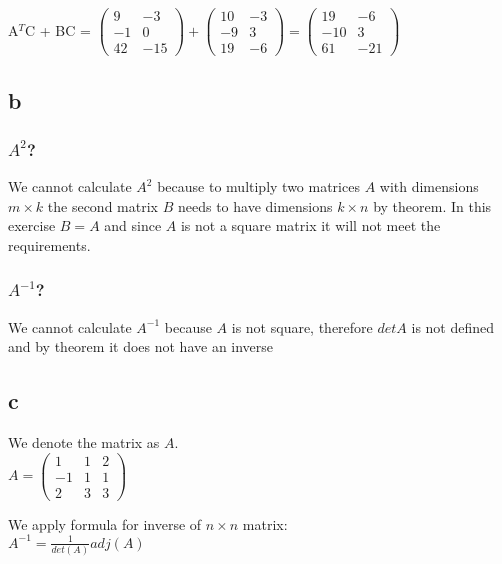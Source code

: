 \documentclass{article}
\begin{document}
A$^{T}$C + BC =
$
\left (
    \begin{matrix}
        9 & -3\\
        -1 & 0\\
        42 & -15
    \end{matrix}
\right )
+
\left (
    \begin{matrix}
        10 & -3\\
        -9 & 3\\
        19 & -6
    \end{matrix}
\right )       
=
\left (
    \begin{matrix}
        19 & -6\\
        -10 & 3\\
        61 & -21
    \end{matrix}
\right )
$

\subsection*{b}

\subsubsection*{$A^{2}$?}
We cannot calculate $A^{2}$ because to multiply two matrices $A$ with dimensions $m \times k$ the second matrix $B$ needs to have dimensions $k \times n$ by theorem. In this exercise $B=A$ and since $A$ is not a square matrix it will not meet the requirements.

\subsubsection*{$A^{-1}$?}
We cannot calculate $A^{-1}$ because $A$ is not square, therefore $detA$ is not defined and by theorem it does not have an inverse

\subsection*{c}
We denote the matrix as $A$.\\
$A=
\left (
    \begin{matrix}
        1 & 1 & 2\\
        -1 & 1 & 1\\
        2 & 3 & 3
    \end{matrix}
\right )
$

We apply formula for inverse of $n \times n$ matrix:\\
$A^{-1} = \frac{1}{det(A)} adj(A)$
\end{document}
